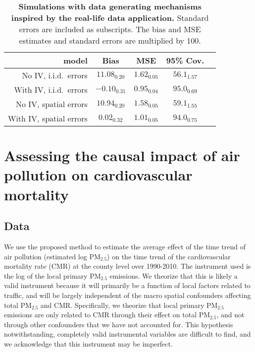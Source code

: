 \documentclass[12pt]{article}
\begin{document}
\begin{table}[h]
\caption{\textbf{Simulations with data generating mechanisms inspired by the real-life data application.} Standard errors are included as subscripts. The bias and MSE estimates and standard errors are multiplied by 100.}
\label{table:realInspiredSim}
\small
\centering
\begin{singlespace}
\begin{center}
\begin{tabular}{ r|cccc } 
model &  Bias &  MSE &  95\% Cov. \\ \hline
No IV, i.i.d.~errors    &  $11.08_{0.20}$ & $1.62_{0.05}$ & $56.1_{1.57}$ \\
With IV, i.i.d.~errors  &  $-0.10_{0.31}$ & $0.95_{0.04}$ & $95.0_{0.69}$ \\
\hline
No IV, spatial errors   &  $10.94_{0.20}$ & $1.58_{0.05}$ & $59.1_{1.55}$ \\
With IV, spatial errors &  $0.02_{0.32}$ & $1.01_{0.05}$ & $94.0_{0.75}$ \\
\hline
\end{tabular}
\end{center}
\end{singlespace}
\end{table}




\section{Assessing the causal impact of air pollution on cardiovascular mortality} \label{s3:realData}

\subsection{Data}

We use the proposed method to estimate the average effect of the time trend of air pollution (estimated log PM$_{2.5}$) on the time trend of the cardiovascular mortality rate (CMR) at the county level over 1990-2010. The instrument used is the log of the local primary PM$_{2.5}$ emissions. We theorize that this is likely a valid instrument because it will primarily be a function of local factors related to traffic, and will be largely independent of the macro spatial confounders affecting total PM$_{2.5}$ and CMR.  Specifically, we theorize that local primary PM$_{2.5}$ emissions are only related to CMR through their effect on total PM$_{2.5}$, and not through other confounders that we have not accounted for. This hypothesis notwithstanding, completely valid instrumental variables are difficult to find, and we acknowledge that this instrument may be imperfect. 
\end{document}
